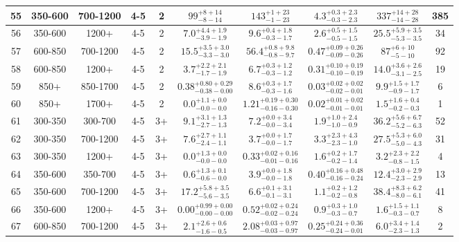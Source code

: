 \documentclass[11pt, oneside]{article}
\begin{document}
\begin{table}
{\begin{tabular}{ |c|c|c|c|c||c|c|c||c|c| }
55 & 350-600 & 700-1200 & 4-5 & 2 & $99^{+ 8+14}_{- 8-14}$ & $143^{+ 1+23}_{- 1-23}$ & $4.3^{+0.3+2.3}_{-0.3-2.3}$ & $337^{+14+28}_{-14-28}$ & 385 \\ \hline
56 & 350-600 & 1200+ & 4-5 & 2 & $7.0^{+4.4+1.9}_{-3.9-1.9}$ & $9.6^{+0.4+1.8}_{-0.3-1.7}$ & $2.6^{+0.5+1.5}_{-0.5-1.5}$ & $25.5^{+5.9+3.5}_{-5.3-3.5}$ & 34 \\ \hline
57 & 600-850 & 700-1200 & 4-5 & 2 & $15.5^{+3.5+3.0}_{-3.3-3.0}$ & $56.4^{+0.8+9.8}_{-0.8-9.7}$ & $0.47^{+0.09+0.26}_{-0.09-0.26}$ & $87^{+ 6+10}_{- 5-10}$ & 92 \\ \hline
58 & 600-850 & 1200+ & 4-5 & 2 & $3.7^{+2.2+2.1}_{-1.7-1.9}$ & $6.7^{+0.3+1.2}_{-0.3-1.2}$ & $0.31^{+0.10+0.19}_{-0.10-0.19}$ & $14.0^{+3.6+2.6}_{-3.1-2.5}$ & 19 \\ \hline
59 & 850+ & 850-1700 & 4-5 & 2 & $0.38^{+0.80+0.29}_{-0.38-0.00}$ & $8.6^{+0.3+1.7}_{-0.3-1.6}$ & $0.03^{+0.02+0.02}_{-0.02-0.01}$ & $9.9^{+1.5+1.7}_{-0.9-1.7}$ & 6 \\ \hline
60 & 850+ & 1700+ & 4-5 & 2 & $0.0^{+1.1+0.0}_{-0.0-0.0}$ & $1.21^{+0.19+0.30}_{-0.16-0.30}$ & $0.02^{+0.01+0.02}_{-0.01-0.01}$ & $1.5^{+1.6+0.4}_{-0.2-0.3}$ & 1 \\ \hline
61 & 300-350 & 300-700 & 4-5 & 3+ & $9.1^{+3.1+1.3}_{-2.7-1.3}$ & $7.2^{+0.0+3.4}_{-0.0-3.4}$ & $1.9^{+1.0+2.4}_{-1.0-0.9}$ & $36.2^{+5.6+6.7}_{-5.2-6.3}$ & 52 \\ \hline
62 & 300-350 & 700-1200 & 4-5 & 3+ & $7.6^{+2.7+1.1}_{-2.4-1.1}$ & $3.7^{+0.0+1.7}_{-0.0-1.7}$ & $3.3^{+2.3+4.3}_{-2.3-1.0}$ & $27.5^{+5.3+6.0}_{-5.0-4.3}$ & 31 \\ \hline
63 & 300-350 & 1200+ & 4-5 & 3+ & $0.0^{+1.3+0.0}_{-0.0-0.0}$ & $0.33^{+0.02+0.16}_{-0.01-0.16}$ & $1.6^{+0.2+1.7}_{-0.2-1.4}$ & $3.2^{+2.3+2.2}_{-0.8-1.5}$ & 4 \\ \hline
64 & 350-600 & 350-700 & 4-5 & 3+ & $0.6^{+1.3+0.1}_{-0.6-0.0}$ & $3.9^{+0.0+1.8}_{-0.0-1.8}$ & $0.40^{+0.16+0.48}_{-0.16-0.24}$ & $12.4^{+3.0+2.9}_{-2.3-2.9}$ & 13 \\ \hline
65 & 350-600 & 700-1200 & 4-5 & 3+ & $17.2^{+5.8+3.5}_{-5.6-3.5}$ & $6.6^{+0.1+3.1}_{-0.1-3.1}$ & $1.1^{+0.2+1.2}_{-0.2-0.8}$ & $38.4^{+8.3+6.2}_{-8.0-6.1}$ & 41 \\ \hline
66 & 350-600 & 1200+ & 4-5 & 3+ & $0.00^{+0.99+0.00}_{-0.00-0.00}$ & $0.52^{+0.02+0.24}_{-0.02-0.24}$ & $0.9^{+0.3+1.0}_{-0.3-0.7}$ & $1.6^{+1.5+1.1}_{-0.3-0.7}$ & 8 \\ \hline
67 & 600-850 & 700-1200 & 4-5 & 3+ & $2.1^{+2.6+0.6}_{-1.6-0.5}$ & $2.08^{+0.03+0.97}_{-0.03-0.97}$ & $0.25^{+0.24+0.36}_{-0.24-0.01}$ & $6.0^{+3.4+1.4}_{-2.3-1.3}$ & 2 \\ \hline

\end{tabular}}
\end{table}
\end{document}
